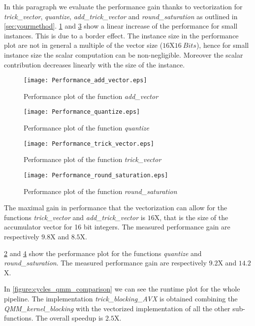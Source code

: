 In this paragraph we evaluate the performance gain thanks to vectorization for \emph{trick\_vector}, \emph{quantize}, \emph{add\_trick\_vector} and \emph{round\_saturation} as outlined in \cref{sec:yourmethod}. \cref{figure:performance_add_vector} and \cref{figure:performance_trick_vector} show a linear increase of the performance for small instances. This is due to a border effect. The instance size in the  performance plot are not in general a multiple of the vector size ($16$X$16 \ Bits$), hence for small instance size the scalar computation can be non-negligible. Moreover the scalar contribution decreases linearly with the size of the instance.

\begin{figure}[h]
\texttt{[image: Performance\_add\_vector.eps]}
\caption{Performance plot of the function \emph{add\_vector}}
\label{figure:performance_add_vector}
\end{figure}

\begin{figure}[h]
	\texttt{[image: Performance\_quantize.eps]}
	\caption{Performance plot of the function \emph{quantize}}
	\label{figure:performance_quantize}
\end{figure}

\begin{figure}[h]
\texttt{[image: Performance\_trick\_vector.eps]}
\caption{Performance plot of the function \emph{trick\_vector}}
\label{figure:performance_trick_vector}
\end{figure}

\begin{figure}[h]
\texttt{[image: Performance\_round\_saturation.eps]}
\caption{Performance plot of the function \emph{round\_saturation}}
\label{figure:performance_round_saturation}
\end{figure}

The maximal gain in performance that the vectorization can allow for the functions \emph{trick\_vector} and \emph{add\_trick\_vector} is $16$X, that is the size of the accumulator vector for 16 bit integers. The measured performance gain are respectively  $9.8$X and $8.5$X.

\cref{figure:performance_quantize} and \cref{figure:performance_round_saturation} show the performance plot for the functions \emph{quantize} and \emph{round\_saturation}. The measured performance gain are respectively $9.2$X and $14.2$X. 

In \cref{figure:cycles_qmm_comparison} we can see the runtime plot for the whole pipeline. The implementation \emph{trick\_blocking\_AVX} is obtained combining the \emph{QMM\_kernel\_blocking} with the vectorized implementation of all the other sub-functions. The overall speedup is $2.5$X.